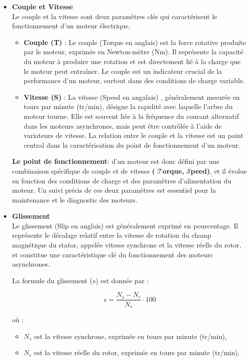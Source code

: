 \begin{itemize}

  \item \textbf{Couple et Vitesse} \\
        Le couple et la vitesse sont deux paramètres clés qui caractérisent le fonctionnement d'un moteur électrique.
        \begin{itemize}
          \item \textbf{Couple (T)} : Le couple (Torque en anglais) est la force rotative produite par le moteur, exprimée en Newton-mètre (Nm). Il représente la capacité du moteur à produire une rotation et est directement lié à la charge que le moteur peut entraîner. Le couple est un indicateur crucial de la performance d'un moteur, surtout dans des conditions de charge variable.
          \item \textbf{Vitesse (S)} : La vitesse (Speed en angalais) , généralement mesurée en tours par minute (tr/min), désigne la rapidité avec laquelle l'arbre du moteur tourne. Elle est souvent liée à la fréquence du courant alternatif dans les moteurs asynchrones, mais peut être contrôlée à l'aide de variateurs de vitesse. La relation entre le couple et la vitesse est un point central dans la caractérisation du point de fonctionnement d'un moteur.
        \end{itemize}
        \textbf{Le point de fonctionnement}: d'un moteur est donc défini par une combinaison spécifique de couple et de vitesse \textbf{(} $\mathcal{T}$\textbf{orque, }$\mathcal{S}$\textbf{peed)}, et il évolue en fonction des conditions de charge et des paramètres d'alimentation du moteur. Un suivi précis de ces deux paramètres est essentiel pour la maintenance et le diagnostic des moteurs.

  \item \textbf{Glissement} \\
        Le glissement (Slip en anglais) est généralement exprimé en pourcentage. Il représente le décalage relatif  entre la vitesse de rotation du champ magnétique du stator, appelée vitesse synchrone  et la vitesse réelle du rotor, et constitue une caractéristique clé du fonctionnement des moteurs asynchrones.

        La formule du glissement (\(s\)) est donnée par :

        \begin{equation}
          s = \frac{N_s - N_r}{N_s} \cdot 100
        \end{equation}

        où :
        \begin{itemize}
          \item \(N_s\) est la vitesse synchrone, exprimée en tours par minute (tr/min),
          \item \(N_r\) est la vitesse réelle du rotor, exprimée en tours par minute (tr/min).
        \end{itemize}


\end{itemize}
